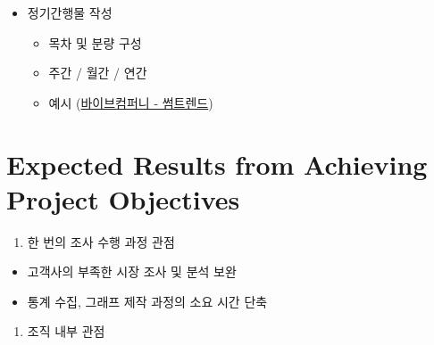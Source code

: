 \documentclass[
]{book}
\providecommand{\tightlist}{%
  \setlength{\itemsep}{0pt}\setlength{\parskip}{0pt}}
\begin{document}
\begin{enumerate}
  \begin{itemize}
  \item
    정기간행물 작성

    \begin{itemize}
    \item
      목차 및 분량 구성
    \item
      주간 / 월간 / 연간
    \item
      예시 (\href{https://some.co.kr/magazine/home}{바이브컴퍼니 - 썸트렌드})
    \end{itemize}
  \end{itemize}
\end{enumerate}

\hypertarget{expected-results-from-achieving-project-objectives}{%
\section{Expected Results from Achieving Project Objectives}\label{expected-results-from-achieving-project-objectives}}

\begin{enumerate}
\def\labelenumi{\arabic{enumi}.}
\tightlist
\item
  한 번의 조사 수행 과정 관점
\end{enumerate}

\begin{itemize}
\item
  고객사의 부족한 시장 조사 및 분석 보완
\item
  통계 수집, 그래프 제작 과정의 소요 시간 단축
\end{itemize}

\begin{enumerate}
\def\labelenumi{\arabic{enumi}.}
\setcounter{enumi}{1}
\tightlist
\item
  조직 내부 관점
\end{enumerate}
\end{document}
